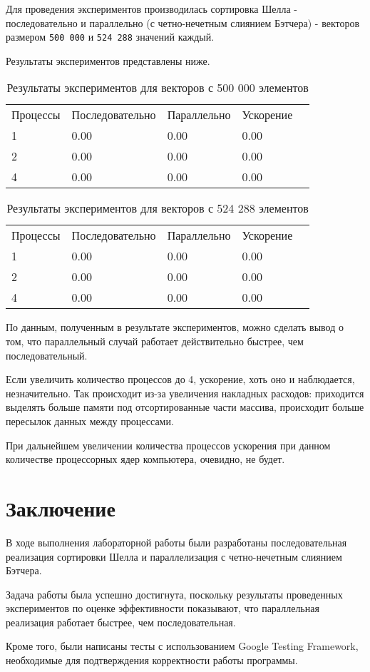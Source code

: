 \documentclass{report}
\begin{document}
\par Для проведения экспериментов производилась сортировка Шелла - последовательно и параллельно (с четно-нечетным слиянием Бэтчера) - векторов размером \verb|500 000| и \verb|524 288| значений каждый. 
\par Результаты экспериментов представлены ниже.

\begin{table}[!h]
\caption{Результаты экспериментов для векторов с 500 000 элементов}
\centering
\begin{tabular}{lllll}
Процессы & Последовательно & Параллельно & Ускорение  \\
1        & 0.00            & 0.00        & 0.00       \\
2        & 0.00            & 0.00        & 0.00       \\
4        & 0.00            & 0.00        & 0.00
\end{tabular}
\end{table}

\begin{table}[!h]
\caption{Результаты экспериментов для векторов с 524 288 элементов}
\centering
\begin{tabular}{lllll}
Процессы & Последовательно & Параллельно & Ускорение  \\
1        & 0.00            & 0.00        & 0.00       \\
2        & 0.00            & 0.00        & 0.00       \\
4        & 0.00            & 0.00        & 0.00
\end{tabular}
\end{table}

\par По данным, полученным в результате экспериментов, можно сделать вывод о том, что параллельный случай работает действительно быстрее, чем последовательный.
\par Если увеличить количество процессов до 4, ускорение, хоть оно и наблюдается, незначительно. Так происходит из-за увеличения накладных расходов: приходится выделять больше памяти под отсортированные части массива, происходит больше пересылок данных между процессами.
\par При дальнейшем увеличении количества процессов ускорения при данном количестве процессорных ядер компьютера, очевидно, не будет.
\newpage

\section*{Заключение}
В ходе выполнения лабораторной работы были разработаны последовательная реализация сортировки Шелла и параллелизация с четно-нечетным слиянием Бэтчера.
\par Задача работы была успешно достигнута, поскольку результаты проведенных экспериментов по оценке эффективности показывают, что параллельная реализация работает быстрее, чем последовательная.
\par Кроме того, были написаны тесты с использованием Google Testing Framework, необходимые для подтверждения корректности работы программы.
\newpage
\end{document}
